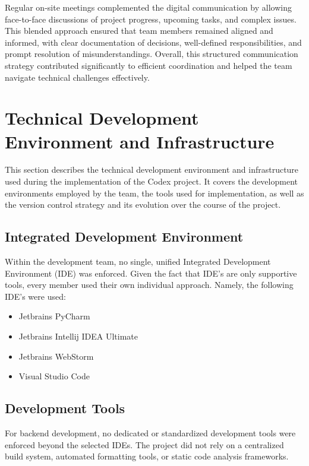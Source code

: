 Regular on-site meetings complemented the digital communication by allowing face-to-face discussions of project progress, upcoming tasks, and complex issues. This blended approach ensured that team members remained aligned and informed, with clear documentation of decisions, well-defined responsibilities, and prompt resolution of misunderstandings. Overall, this structured communication strategy contributed significantly to efficient coordination and helped the team navigate technical challenges effectively.

\section{Technical Development Environment and Infrastructure}
\label{subsec:technical-environment}

This section describes the technical development environment and infrastructure used during the implementation of the Codex project. It covers the development environments employed by the team, the tools used for implementation, as well as the version control strategy and its evolution over the course of the project.

\subsection{Integrated Development Environment}
\label{subsubsec:ide}

Within the development team, no single, unified Integrated Development Environment (IDE) was enforced.
Given the fact that IDE's are only supportive tools, every member used their own individual approach.
Namely, the following IDE's were used:

\begin{itemize}
    \item Jetbrains PyCharm
    \item Jetbrains Intellij IDEA Ultimate
    \item Jetbrains WebStorm
    \item Visual Studio Code
\end{itemize}

\subsection{Development Tools}
\label{subsubsec:dev-tools}

For backend development, no dedicated or standardized development tools were enforced beyond the selected IDEs. The project did not rely on a centralized build system, automated formatting tools, or static code analysis frameworks.

